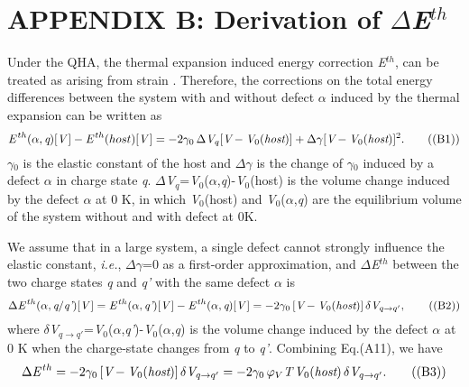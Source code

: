 \documentclass[onecolumn,preprint,superscriptaddress]{revtex4-1}
\begin{document}
\section*{APPENDIX B: Derivation of $\Delta$\emph{E}$^{th}$}
Under the QHA, the thermal expansion induced energy correction \emph{E}$^{th}$, can be treated as arising from strain \cite{42,43}. Therefore, the corrections on the total energy differences between the system with and without defect $\alpha$ induced by the thermal expansion can be written as \cite{45}
\begin{equation}
\emph{E}^{\,th}(\alpha,\emph{q})[\emph{V}\,]-\emph{E}^{\,th}(host)[\emph{V}\,]=-2\gamma_0\,\Delta\emph{V}_{q}[\emph{V}-
\emph{V}_{0}(\emph{host})]+\Delta\gamma[\emph{V}-\emph{V}_{0}(\emph{host})]^2.   \tag{(B1)}
\end{equation}
\noindent $\gamma$$_0$ is the elastic constant of the host and $\Delta$$\gamma$ is the change of $\gamma$$_0$ induced by a defect $\alpha$ in charge state \emph{q}. $\Delta$\emph{V}$_{q}$=\emph{V}$_{0}$($\alpha$,\emph{q})-\emph{V}$_{0}$(host) is the volume change induced by the defect $\alpha$ at 0 K, in which \emph{V}$_{0}$(host) and \emph{V}$_{0}$($\alpha$,\emph{q}) are the equilibrium volume of the system without and with defect at 0K.

We assume that in a large system, a single defect cannot strongly influence the elastic constant, \emph{i.e.}, $\Delta$$\gamma$=0 as a first-order approximation, and $\Delta$\emph{E}$^{th}$ between the two charge states \emph{q} and \emph{q'} with the same defect $\alpha$ is
\begin{equation}
\Delta\emph{E}^{\,th}(\alpha,\emph{q}/\emph{q'})[\emph{V}\,]=\emph{E}^{\,th}(\alpha,\emph{q'})[\emph{V}\,]-
\emph{E}^{\,th}(\alpha,\emph{q})[\emph{V}\,]=-2\gamma_0\,[\emph{V}-\emph{V}_{0}(\emph{host})]\,\delta\emph{V}_{q\rightarrow q'},   \tag{(B2)}
\end{equation}
\noindent where $\delta$\emph{V}$_{q\rightarrow q'}$=\emph{V}$_{0}$($\alpha$,\emph{q'})-\emph{V}$_{0}$($\alpha$,\emph{q}) is the volume change induced by the defect $\alpha$ at 0 K when the charge-state changes from \emph{q} to \emph{q'}. Combining Eq.(A11), we have
\begin{equation}
\Delta\emph{E}^{\,th} =-2\gamma_0\,[\emph{V}-\emph{V}_{0}(\emph{host})]\,\delta\emph{V}_{q\rightarrow q'}
=-2\gamma_0\,\varphi_{V}\emph{T}\,\emph{V}_{0}(\emph{host})\,\delta\emph{V}_{q\rightarrow q'}.   \tag{(B3)}
\end{equation}
\end{document}
